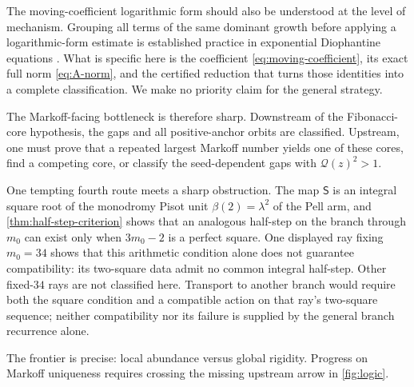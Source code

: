 The moving-coefficient logarithmic form should also be understood at the
level of mechanism. Grouping all terms of the same dominant growth before
applying a logarithmic-form estimate is established practice in exponential
Diophantine equations
\cite{DdamuliraLucaRakotomalala2016,BravoDasHerreraSaunders2026}. What is
specific here is the coefficient \cref{eq:moving-coefficient}, its exact
full norm \cref{eq:A-norm}, and the certified reduction that turns those
identities into a complete classification. We make no priority claim for the
general strategy.

The Markoff-facing bottleneck is therefore sharp. Downstream of the
Fibonacci-core hypothesis, the gaps and all positive-anchor orbits are
classified. Upstream, one must prove that a repeated largest Markoff number
yields one of these cores, find a competing core, or classify the
seed-dependent gaps with $\mathcal Q(z)^2>1$.

One tempting fourth route meets a sharp obstruction. The map $\mathsf S$ is
an integral square root of the monodromy Pisot unit
$\beta(2)=\lambda^2$ of the Pell arm, and
\cref{thm:half-step-criterion} shows that an analogous half-step on
the branch through $m_0$ can exist only when $3m_0-2$ is a perfect square.
One displayed ray fixing $m_0=34$ shows that this arithmetic condition alone
does not guarantee compatibility: its two-square data admit no common
integral half-step. Other fixed-$34$ rays are not classified here. Transport
to another branch would require both the square condition and a compatible
action on that ray's two-square sequence; neither compatibility nor its
failure is supplied by the general branch recurrence alone.

The frontier is precise: local abundance versus global rigidity. Progress on
Markoff uniqueness requires crossing the missing upstream arrow in
\cref{fig:logic}.
